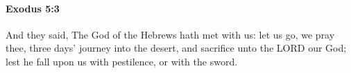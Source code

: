 
		\paragraph{Exodus 5:3} %
			\label{EXODUS-5-3}

			And they said, The God of the Hebrews hath met with us: let us go, we pray thee, three days' journey into the desert, and sacrifice unto the LORD our God; lest he fall upon us with pestilence, or with the sword.


